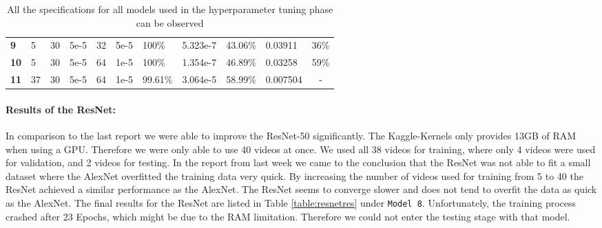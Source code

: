 \documentclass{article}
\begin{document}
\begin{table}[H]
{\begin{tabular}{lllllllllll}
\textbf{9}        & 5                  & 30                 & 5e-5                    & 32                   & \multicolumn{1}{l|}{5e-5} & 100\%               & 5.323e-7             & 43.06\%           & 0.03911            & 36\%                  \\
\textbf{10}       & 5                  & 30                 & 5e-5                    & 64                   & \multicolumn{1}{l|}{1e-5} & 100\%               & 1.354e-7             & 46.89\%           & 0.03258            & 59\%                  \\
\textbf{11}       & 37                 & 30                 & 5e-5                    & 64                   & \multicolumn{1}{l|}{1e-5} & 99.61\%             & 3.064e-5             & 58.99\%           & 0.007504           & \multicolumn{1}{c}{-} \\ \hline
\end{tabular}%
}
\caption{All the specifications for all models used in the hyperparameter tuning phase can be observed}
\end{table}


\paragraph{\textbf{Results of the ResNet:}}
In comparison to the last report we were able to improve the ResNet-50 significantly. The Kaggle-Kernels only provides 13GB of RAM when using a GPU. Therefore we were only able to use 40 videos at once. We used all 38 videos for training, where only 4 videos were used for validation, and 2 videos for testing. In the report from last week we came to the conclusion that the ResNet was not able to fit a small dataset where the AlexNet overfitted the training data very quick. By increasing the number of videos used for training from 5 to 40 the ResNet achieved a similar performance as the AlexNet. The ResNet seems to converge slower and does not tend to overfit the data as quick as the AlexNet. The final results for the ResNet are listed in Table \ref{table:resnetres} under \texttt{Model 8}. Unfortunately, the training process crashed after 23 Epochs, which might be due to the RAM limitation. Therefore we could not enter the testing stage with that model.
\end{document}
